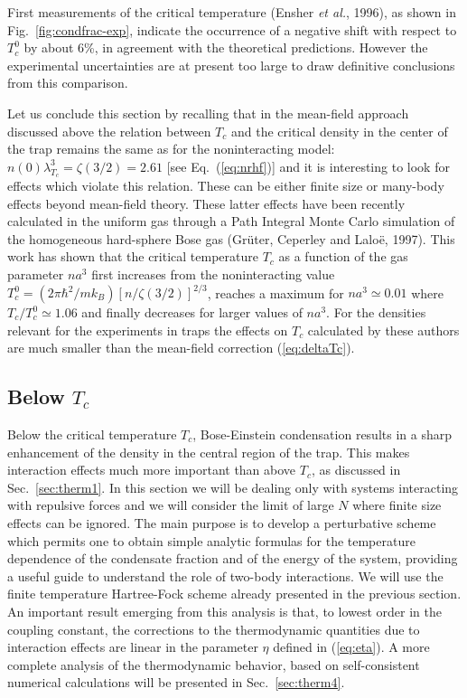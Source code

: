 First measurements of the critical temperature (Ensher {\it et al.}, 1996),
as shown in Fig.~\ref{fig:condfrac-exp}, indicate the occurrence of a 
negative shift with respect to $T_c^0$ by about 6\%,  in agreement with 
the theoretical predictions. However the experimental uncertainties are 
at present too large to draw definitive conclusions from this
comparison. 

Let us conclude this section by recalling that in the mean-field approach
discussed above the relation  between $T_c$ and the critical density in the
center of the trap  remains the same as for the  noninteracting model:
$n(0) \lambda^3_{T_{c}}=\zeta(3/2)=2.61$ [see Eq.~(\ref{eq:nrhf})] and it
is   interesting to  look for effects which violate this relation.
These can be either finite size or  many-body effects  beyond mean-field
theory. These latter effects have been recently calculated  in the uniform gas
 through a Path Integral Monte  Carlo simulation of the homogeneous 
hard-sphere Bose  gas (Gr\"uter, Ceperley and Lalo\"e, 1997). 
This work  has shown that the critical
temperature $T_c$ as a function of the gas parameter $na^3$ first  increases
from the noninteracting value 
$T_c^0=(2\pi\hbar^2/mk_B) [n/\zeta(3/2)]^{2/3}$,
reaches a maximum for $na^3\simeq 0.01$  where  $T_c/T_c^0\simeq1.06$ and
finally decreases for larger values of $na^3$.  For the densities relevant 
for the experiments in traps  the effects on $T_c$ calculated by these 
authors are much smaller than the mean-field correction (\ref{eq:deltaTc}).  


\subsection{Below $T_c$}
\label{sec:therm3}

Below the critical temperature $T_c$, Bose-Einstein condensation 
results in a sharp enhancement of the density in the central region 
of the trap. This makes interaction effects much more important than 
above $T_c$, as discussed in Sec.~\ref{sec:therm1}.  In this section we
will be dealing only
with systems interacting with repulsive forces and we will  consider
the limit of large $N$ where finite size effects can be ignored.
The main purpose is to develop a perturbative scheme which permits
one to obtain simple analytic formulas for the temperature dependence
of the condensate fraction and of the energy of the system, providing 
a useful guide to understand the role of two-body interactions. 
We will use the finite temperature Hartree-Fock scheme 
already presented in the previous section. An important result emerging 
from this analysis is that, to lowest order in the
coupling constant, the corrections to the thermodynamic quantities due to
interaction effects are linear in the parameter $\eta$ defined in
(\ref{eq:eta}). A more complete analysis of the thermodynamic behavior,
based on  self-consistent numerical calculations will be presented in
Sec.~\ref{sec:therm4}.

